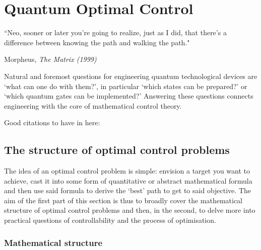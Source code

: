 \chapter{Quantum Optimal Control}\label{chap:3_Quantum_Optimal_control}
\epigraph{``Neo, sooner or later you’re going to realize, just as I did, that there’s a difference between knowing the path and walking the path."}{Morpheus, \emph{The Matrix (1999)}}


Natural and foremost questions for engineering quantum technological devices are ‘what can one do with them?’, in particular ‘which states can be prepared?’ or ‘which quantum gates can be implemented?’ Answering these questions connects engineering with the core of mathematical control theory.



Good citations to have in here: \cite{schirmer_complete_2001, koch_quantum_2022,glaser_training_2015}


\section{The structure of optimal control problems}\label{sec:3.1_structure_quantum_control}

The idea of an optimal control problem is simple: envision a target you want to achieve, cast it into some form of quantitative or abstract mathematical formula and then use said formula to derive the `best' path to get to said objective. The aim of the first part of this section is thus to broadly cover the mathematical structure of optimal control problems and then, in the second, to delve more into practical questions of controllability and the process of optimisation.

\subsection{Mathematical structure}\label{sec:3.1.1_mathematical_structure}

